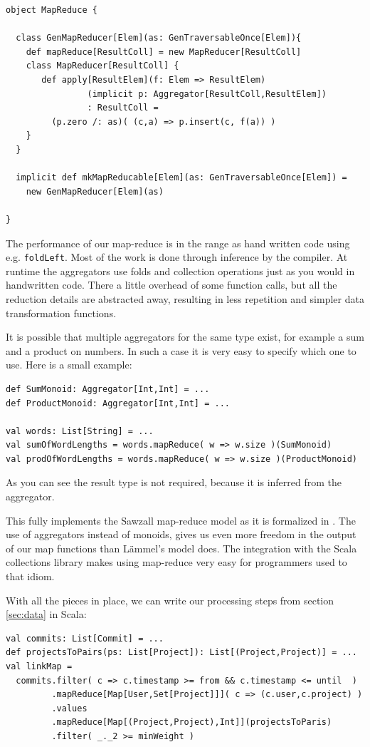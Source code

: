 \documentclass[10pt,a4paper]{article}
\begin{document}
\begin{lstlisting}[float,frame=tb,caption=MapReduce for Scala collections,label=lst:map-reduce]
object MapReduce {

  class GenMapReducer[Elem](as: GenTraversableOnce[Elem]){
    def mapReduce[ResultColl] = new MapReducer[ResultColl]
    class MapReducer[ResultColl] {
       def apply[ResultElem](f: Elem => ResultElem)
                (implicit p: Aggregator[ResultColl,ResultElem])
                : ResultColl =
  	     (p.zero /: as)( (c,a) => p.insert(c, f(a)) )
    }
  }

  implicit def mkMapReducable[Elem](as: GenTraversableOnce[Elem]) =
    new GenMapReducer[Elem](as)

}
\end{lstlisting}

The performance of our map-reduce is in the range as hand written code using e.g. \lstinline|foldLeft|. Most of the work is done through inference by the compiler. At runtime the aggregators use folds and collection operations just as you would in handwritten code. There a little overhead of some function calls, but all the reduction details are abstracted away, resulting in less repetition and simpler data transformation functions.

It is possible that multiple aggregators for the same type exist, for example a sum and a product on numbers. In such a case it is very easy to specify which one to use. Here is a small example:
\begin{lstlisting}
def SumMonoid: Aggregator[Int,Int] = ...
def ProductMonoid: Aggregator[Int,Int] = ...

val words: List[String] = ...
val sumOfWordLengths = words.mapReduce( w => w.size )(SumMonoid)
val prodOfWordLengths = words.mapReduce( w => w.size )(ProductMonoid)
\end{lstlisting}
As you can see the result type is not required, because it is inferred from the aggregator.

This fully implements the Sawzall map-reduce model as it is formalized in \cite{lammel2008google}. The use of aggregators instead of monoids, gives us even more freedom in the output of our map functions than L\"ammel's model does. The integration with the Scala collections library makes using map-reduce very easy for programmers used to that idiom.

With all the pieces in place, we can write our processing steps from section \ref{sec:data} in Scala:
\begin{lstlisting}
val commits: List[Commit] = ...
def projectsToPairs(ps: List[Project]): List[(Project,Project)] = ...
val linkMap = 
  commits.filter( c => c.timestamp >= from && c.timestamp <= until  )
         .mapReduce[Map[User,Set[Project]]]( c => (c.user,c.project) )
         .values
         .mapReduce[Map[(Project,Project),Int]](projectsToParis)
         .filter( _._2 >= minWeight )
\end{lstlisting}
\end{document}
